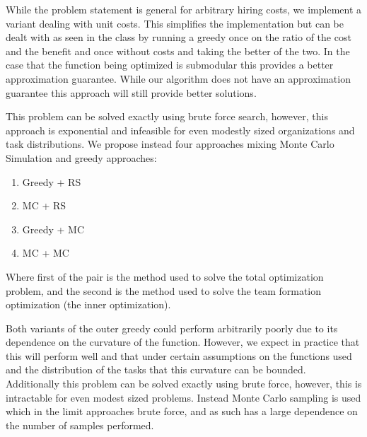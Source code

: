 While the problem statement is general for arbitrary hiring costs, we implement a variant dealing with unit costs. This simplifies the implementation but can be dealt with as seen in the class by running a greedy once on the ratio of the cost and the benefit and once without costs and taking the better of the two. In the case that the function being optimized is submodular this provides a better approximation guarantee. While our algorithm does not have an approximation guarantee this approach will still provide better solutions. 

This problem can be solved exactly using brute force search, however, this approach is exponential and infeasible for even modestly sized organizations and task distributions. We propose instead four approaches mixing Monte Carlo Simulation and greedy approaches: 

\begin{enumerate}
    \item Greedy + RS
    \item MC + RS
    \item Greedy + MC
    \item MC + MC
\end{enumerate}

Where first of the pair is the method used to solve the total optimization problem, and the second is the method used to solve the team formation optimization (the inner optimization).



Both variants of the outer greedy could perform arbitrarily poorly due to its dependence on the curvature of the function. However, we expect in practice that this will perform well and that under certain assumptions on the functions used and the distribution of the tasks that this curvature can be bounded. Additionally this problem can be solved exactly using brute force, however, this is intractable for even modest sized problems. Instead Monte Carlo sampling is used which in the limit approaches brute force, and as such has a large dependence on the number of samples performed.  

